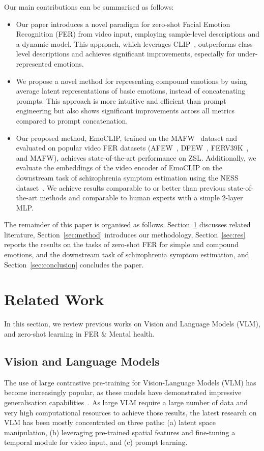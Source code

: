 \documentclass[10pt,twocolumn,letterpaper]{article}
\begin{document}
Our main contributions can be summarised as follows:
\begin{itemize}
    \item Our paper introduces a novel paradigm for zero-shot Facial Emotion Recognition (FER) from video input, employing sample-level descriptions and a dynamic model. This approach, which leverages CLIP~\cite{radford_CLIP_2021}, outperforms class-level descriptions and achieves significant improvements, especially for under-represented emotions.
    \item We propose a novel method for representing compound emotions by using average latent representations of basic emotions, instead of concatenating prompts. This approach is more intuitive and efficient than prompt engineering but also shows significant improvements across all metrics compared to prompt concatenation.
    \item Our proposed method, EmoCLIP, trained on the MAFW~\cite{liu_mafw_2022} dataset and evaluated on popular video FER datasets (AFEW~\cite{afew}, DFEW~\cite{dfew}, FERV39K~\cite{ferv39k}, and MAFW), achieves state-of-the-art performance on ZSL. Additionally, we evaluate the embeddings of the video encoder of EmoCLIP on the downstream task of schizophrenia symptom estimation using the NESS dataset~\cite{ness}. We achieve results comparable to or better than previous state-of-the-art methods and comparable to human experts with a simple 2-layer MLP.
\end{itemize}
The remainder of this paper is organised as follows. Section~\ref{sec:related} discusses related literature, Section~\ref{sec:method} introduces our methodology, Section~\ref{sec:res} reports the results on the tasks of zero-shot FER for simple and compound emotions, and the downstream task of schizophrenia symptom estimation, and Section~\ref{sec:conclusion} concludes the paper.

\section{Related Work}
\label{sec:related}
In this section, we review previous works on Vision and Language Models (VLM), and zero-shot learning in FER \& Mental health.

\subsection{Vision and Language Models}

The use of large contrastive pre-training for Vision-Language Models (VLM) has become increasingly popular, as these models have demonstrated impressive generalisation capabilities~\cite{radford_CLIP_2021, jia2021align, zheng_FARL_2022, alayrac2022flamingo}. As large VLM require a large number of data and very high computational resources to achieve those results, the latest research on VLM has been mostly concentrated on three paths: (a) latent space manipulation, (b) leveraging pre-trained spatial features and fine-tuning a temporal module for video input, and (c) prompt learning.  
\end{document}
